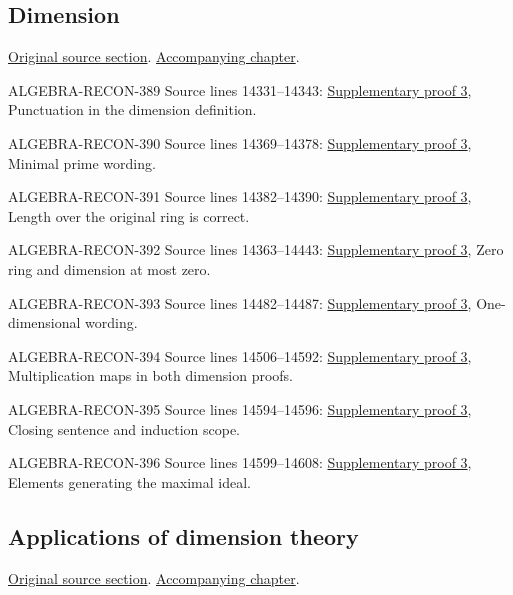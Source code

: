 \subsection{Dimension}
\hypertarget{algebra-source-section-dimension}{}
\noindent\href{https://github.com/stacks/stacks-project/blob/a04446e57ec1fbc252a871afcec7752fb2807b14/algebra.tex\#L14305}{Original source section}. \href{algebra.pdf\#nameddest=section-dimension}{Accompanying chapter}.

\begin{AlgebraSourceRoutes}
\item[ALGEBRA-RECON-389] Source lines 14331--14343: \hyperlink{algebra_local_hilbert_dimension_notes_20260927}{Supplementary proof 3}, Punctuation in the dimension definition.
\item[ALGEBRA-RECON-390] Source lines 14369--14378: \hyperlink{algebra_local_hilbert_dimension_notes_20260927}{Supplementary proof 3}, Minimal prime wording.
\item[ALGEBRA-RECON-391] Source lines 14382--14390: \hyperlink{algebra_local_hilbert_dimension_notes_20260927}{Supplementary proof 3}, Length over the original ring is correct.
\item[ALGEBRA-RECON-392] Source lines 14363--14443: \hyperlink{algebra_local_hilbert_dimension_notes_20260927}{Supplementary proof 3}, Zero ring and dimension at most zero.
\item[ALGEBRA-RECON-393] Source lines 14482--14487: \hyperlink{algebra_local_hilbert_dimension_notes_20260927}{Supplementary proof 3}, One-dimensional wording.
\item[ALGEBRA-RECON-394] Source lines 14506--14592: \hyperlink{algebra_local_hilbert_dimension_notes_20260927}{Supplementary proof 3}, Multiplication maps in both dimension proofs.
\item[ALGEBRA-RECON-395] Source lines 14594--14596: \hyperlink{algebra_local_hilbert_dimension_notes_20260927}{Supplementary proof 3}, Closing sentence and induction scope.
\item[ALGEBRA-RECON-396] Source lines 14599--14608: \hyperlink{algebra_local_hilbert_dimension_notes_20260927}{Supplementary proof 3}, Elements generating the maximal ideal.
\end{AlgebraSourceRoutes}

\subsection{Applications of dimension theory}
\hypertarget{algebra-source-section-applications-dimension-theory}{}
\noindent\href{https://github.com/stacks/stacks-project/blob/a04446e57ec1fbc252a871afcec7752fb2807b14/algebra.tex\#L14731}{Original source section}. \href{algebra.pdf\#nameddest=section-applications-dimension-theory}{Accompanying chapter}.

